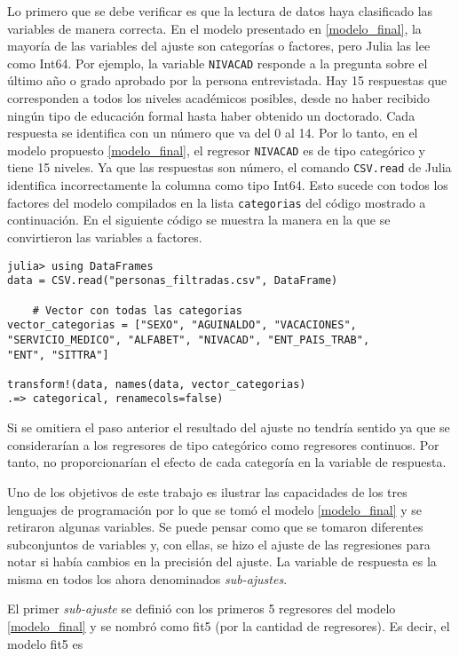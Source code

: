 Lo primero que se debe verificar es que la lectura de datos haya clasificado las variables de manera correcta. En el modelo presentado en \ref{modelo_final}, la mayoría de las variables del ajuste son categorías o factores, pero \textsf{Julia} las lee como \textsf{Int64}. Por ejemplo, la variable \texttt{NIVACAD} responde a la pregunta sobre el último año o grado aprobado por la persona entrevistada. Hay 15 respuestas que corresponden a todos los niveles académicos posibles, desde no haber recibido ningún tipo de educación formal hasta haber obtenido un doctorado. Cada respuesta se identifica con un número que va del 0 al 14. Por lo tanto, en el modelo propuesto \ref{modelo_final}, el regresor \texttt{NIVACAD} es de tipo categórico y tiene 15 niveles. Ya que las respuestas son número, el comando \texttt{CSV.read} de \textsf{Julia} identifica incorrectamente la columna como tipo \textsf{Int64}. Esto sucede con todos los factores del modelo compilados en la lista \texttt{categorias} del código mostrado a continuación. En el siguiente código se muestra la manera en la que se convirtieron las variables a factores. 

\begin{verbatim}
julia> using DataFrames
data = CSV.read("personas_filtradas.csv", DataFrame)

	# Vector con todas las categorias
vector_categorias = ["SEXO", "AGUINALDO", "VACACIONES", 
"SERVICIO_MEDICO", "ALFABET", "NIVACAD", "ENT_PAIS_TRAB", 
"ENT", "SITTRA"]

transform!(data, names(data, vector_categorias) 
.=> categorical, renamecols=false)
\end{verbatim}

Si se omitiera el paso anterior el resultado del ajuste no tendría sentido ya que se considerarían a los regresores de tipo categórico como regresores continuos. Por tanto, no proporcionarían el efecto de cada categoría en la variable de respuesta.

Uno de los objetivos de este trabajo es ilustrar las capacidades de los tres lenguajes de programación por lo que se tomó el modelo \ref{modelo_final} y se retiraron algunas variables. Se puede pensar como que se tomaron diferentes subconjuntos de variables y, con ellas, se hizo el ajuste de las regresiones para notar si había cambios en la precisión del ajuste. La variable de respuesta es la misma en todos los ahora denominados \textit{sub-ajustes}.

El primer \textit{sub-ajuste} se definió con los primeros 5 regresores del modelo \ref{modelo_final} y se nombró como \textsf{fit5} (por la cantidad de regresores). Es decir, el modelo \textsf{fit5} es 

